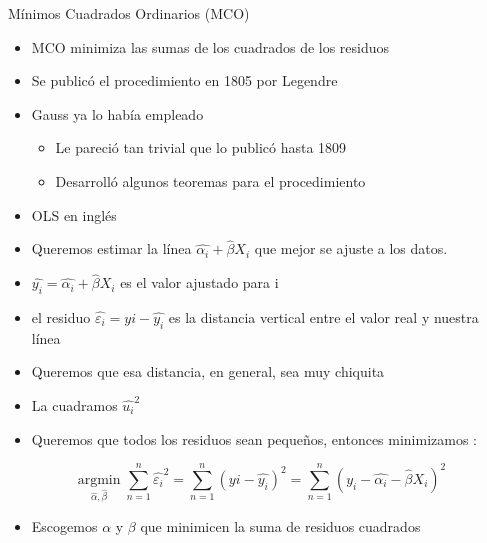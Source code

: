 \documentclass[
  ignorenonframetext,
]{beamer}
\providecommand{\tightlist}{%
  \setlength{\itemsep}{0pt}\setlength{\parskip}{0pt}}
\begin{document}
\begin{frame}{Mínimos Cuadrados Ordinarios (MCO)}
\protect\hypertarget{muxednimos-cuadrados-ordinarios-mco}{}
\begin{itemize}
\item
  MCO minimiza las sumas de los cuadrados de los residuos
\item
  Se publicó el procedimiento en 1805 por Legendre
\item
  Gauss ya lo había empleado

  \begin{itemize}
  \tightlist
  \item
    Le pareció tan trivial que lo publicó hasta 1809
  \item
    Desarrolló algunos teoremas para el procedimiento
  \end{itemize}
\item
  OLS en inglés
\end{itemize}
\end{frame}

\begin{frame}{}
\protect\hypertarget{section-4}{}
\begin{itemize}
\tightlist
\item
  Queremos estimar la línea \(\hat{\alpha_i}+ \hat{\beta} X_i\) que
  mejor se ajuste a los datos.
\item
  \(\hat{y_i}=\hat{\alpha_i}+ \hat{\beta} X_i\) es el valor ajustado
  para i
\item
  el residuo \(\hat{\varepsilon_i}=yi-\hat{y_i}\) es la distancia
  vertical entre el valor real y nuestra línea
\end{itemize}
\end{frame}

\begin{frame}{}
\protect\hypertarget{section-5}{}
\begin{itemize}
\tightlist
\item
  Queremos que esa distancia, en general, sea muy chiquita
\item
  La cuadramos \(\hat{u_i}^2\)
\item
  Queremos que todos los residuos sean pequeños, entonces minimizamos :
\end{itemize}

\[\underset{\hat{\alpha}, \hat{\beta}}{\operatorname{argmin}}\sum_{n=1}^{n} \hat{\varepsilon_i}^2= \sum_{n=1}^{n} (yi-\hat{y_i})^2= \sum_{n=1}^{n} (y_i - \hat{\alpha_i}- \hat{\beta} X_i)^2  \]

\begin{itemize}
\tightlist
\item
  Escogemos \(\alpha\) y \(\beta\) que minimicen la suma de residuos
  cuadrados
\end{itemize}
\end{frame}
\end{document}
